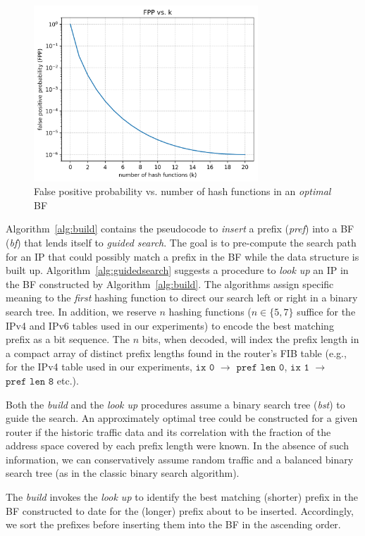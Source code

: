 \documentclass[conference,compsoc]{IEEEtran}
\begin{document}
\begin{figure}[h]
\centering
\includegraphics[height=2.6in]{../img/PvsK.png}
  \caption{False positive probability vs. number of hash functions in an \emph{optimal} BF}
\label{fig:fpp}
\end{figure}


Algorithm~\ref{alg:build} contains the pseudocode to \emph{insert} a prefix
(\emph{pref}) into a BF (\emph{bf}) that lends itself to 
\emph{guided search}. The goal is to pre-compute the search 
path for an IP that could possibly match a prefix in the BF
while the data structure is built up.
Algorithm~\ref{alg:guidedsearch} suggests
a procedure to \emph{look up} an IP in the BF constructed by
Algorithm~\ref{alg:build}. The
algorithms assign specific meaning to the \emph{first} hashing function
to direct our search left or right in a binary search tree. In addition, we
reserve $n$ hashing functions ($n\in\{5,7\}$ suffice for the IPv4 and IPv6
tables used in our experiments) to encode
the best matching prefix as a bit sequence. The $n$ bits, when decoded,
will index the prefix length in a compact array of distinct prefix lengths
found in the router's FIB table (e.g., for the IPv4 table used in our 
experiments, $\texttt{ix 0}$ $\rightarrow$ 
$\texttt{pref len 0}$, $\texttt{ix 1}$ $\rightarrow$ $\texttt{pref len 8}$
etc.).

Both the \emph{build} and the \emph{look up} procedures assume a
binary search tree (\emph{bst}) to guide the search. An approximately 
optimal tree could
be constructed for a given router if the historic traffic data and its 
correlation with the fraction of the address space covered by each prefix length
were known. In the absence of such information, we can conservatively
assume random traffic and a balanced binary search tree (as in the
classic binary search algorithm).

The \emph{build} invokes the \emph{look up} to identify the
best matching (shorter) prefix in the BF constructed to date for the 
(longer) prefix
about to be inserted. Accordingly, we sort the prefixes before
inserting them into the BF in the ascending order.
\end{document}
